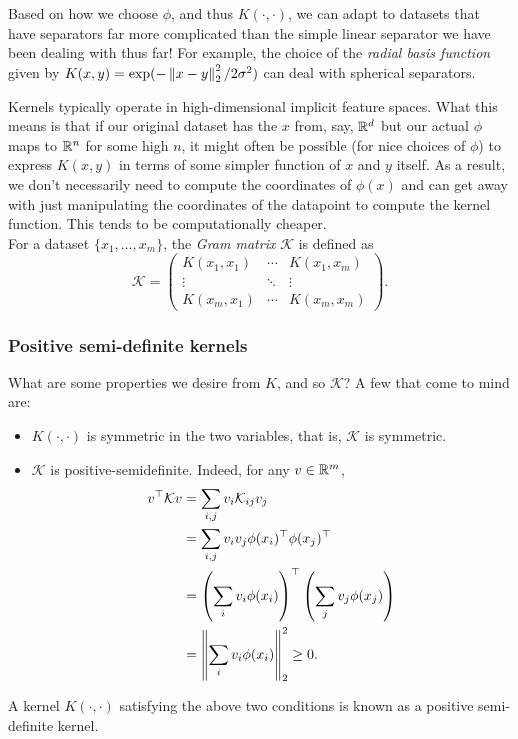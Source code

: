 \documentclass{article}
\begin{document}
			Based on how we choose $\phi$, and thus $K(\cdot,\cdot)$, we can adapt to datasets that have separators far more complicated than the simple linear separator we have been dealing with thus far! For example, the choice of the \emph{radial basis function} given by $K(x,y) = \exp(-\left\lVert x-y\right\rVert_2^2/2\sigma^2)$ can deal with spherical separators.

			Kernels typically operate in high-dimensional implicit feature spaces. What this means is that if our original dataset has the $x$ from, say, $\mathbb{R}^d$ but our actual $\phi$ maps to $\mathbb{R}^n$ for some high $n$, it might often be possible (for nice choices of $\phi$) to express $K(x,y)$ in terms of some simpler function of $x$ and $y$ itself. As a result, we don't necessarily need to compute the coordinates of $\phi(x)$ and can get away with just manipulating the coordinates of the datapoint to compute the kernel function. This tends to be computationally cheaper.\\

			For a dataset $\{x_1,\ldots,x_m\}$, the \emph{Gram matrix} $\mathcal{K}$ is defined as
			\[
			\mathcal{K} =
			\begin{pmatrix}
				K(x_1,x_1) & \cdots & K(x_1,x_m) \\
				\vdots & \ddots & \vdots \\
				K(x_m,x_1) & \cdots & K(x_m,x_m)
			\end{pmatrix}.
			\]

		\subsubsection{Positive semi-definite kernels}

			What are some properties we desire from $K$, and so $\mathcal{K}$? A few that come to mind are:
			\begin{itemize}
				\item $K(\cdot,\cdot)$ is symmetric in the two variables, that is, $\mathcal{K}$ is symmetric.
				\item $\mathcal{K}$ is positive-semidefinite. Indeed, for any $v\in\mathbb{R}^m$,
				\begin{align*}
					v^\top\mathcal{K}v &= \sum_{i,j} v_i \mathcal{K}_{ij} v_j \\
						&= \sum_{i,j} v_i v_j \phi(x_i)^\top \phi(x_j)^\top \\
						&= \left(\sum_i v_i \phi(x_i)\right)^\top \left(\sum_j v_j \phi(x_j)\right) \\
						&= \left\lVert\sum_i v_i \phi(x_i)\right\rVert_2^2 \ge 0.
				\end{align*}
			\end{itemize}
			A kernel $K(\cdot,\cdot)$ satisfying the above two conditions is known as a positive semi-definite kernel.\\
\end{document}
